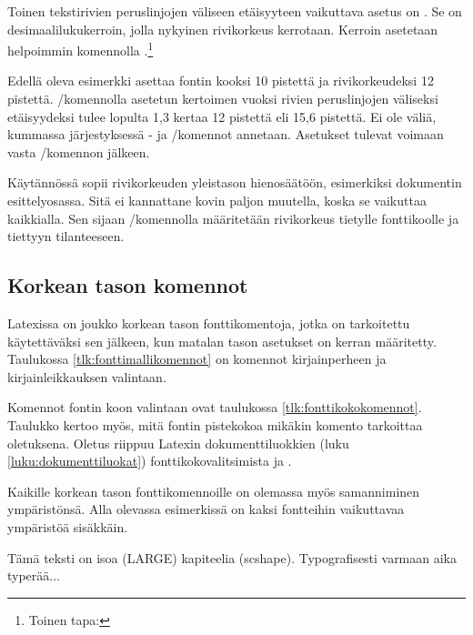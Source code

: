 Toinen tekstirivien peruslinjojen väliseen etäisyyteen vaikuttava asetus
on . Se on desimaalilukukerroin, jolla
nykyinen rivikorkeus kerrotaan. Kerroin asetetaan helpoimmin komennolla
.\footnote{Toinen tapa: }

\begin{koodilohkosis}
  \fontsize{10pt}{12pt} \linespread{1.3} \selectfont
\end{koodilohkosis}

Edellä oleva esimerkki asettaa fontin kooksi 10 pistettä ja
rivikorkeudeksi 12 pistettä. \-/komennolla
asetetun kertoimen vuoksi rivien peruslinjojen väliseksi etäisyydeksi
tulee lopulta 1,3 kertaa 12 pistettä eli 15,6 pistettä. Ei ole väliä,
kummassa järjestyksessä - ja \-/komennot annetaan. Asetukset tulevat voimaan vasta
\-/komennon jälkeen.

Käytännössä  sopii rivikorkeuden yleistason
hienosäätöön, esimerkiksi dokumentin esittely\-osassa. Sitä ei
kannattane kovin paljon muutella, koska se vaikuttaa kaikkialla. Sen
sijaan \-/komennolla määritetään rivikorkeus
tietylle fonttikoolle ja tiettyyn tilanteeseen.

\subsection{Korkean tason komennot}
\label{luku:fontit_korkea}

Latexissa on joukko korkean tason fontti\-komentoja, jotka on
tarkoitettu käytettäväksi sen jälkeen, kun matalan tason asetukset on
kerran määritetty. Taulukossa \ref{tlk:fonttimallikomennot} on komennot
kirjainperheen ja kirjainleikkauksen valintaan.

Komennot fontin koon valintaan ovat taulukossa
\ref{tlk:fonttikokokomennot}. Taulukko kertoo myös, mitä
fontin pistekokoa mikäkin komento tarkoittaa oletuksena. Oletus riippuu
Latexin dokumenttiluokkien (luku \ref{luku:dokumenttiluokat})
fonttikokovalitsimista \koodi{10pt, 11pt} ja \koodi{12pt}.

Kaikille korkean tason fonttikomennoille on olemassa myös samanniminen
ympäristönsä. Alla olevassa esimerkissä on kaksi fontteihin vaikuttavaa
ympäristöä sisäkkäin.

\begin{koodilohkosis}
  \begin{LARGE}
    \begin{scshape}
      Tämä teksti on isoa (LARGE) kapiteelia (scshape).
      Typografisesti varmaan aika typerää...
    \end{scshape}
  \end{LARGE}
\end{koodilohkosis}

